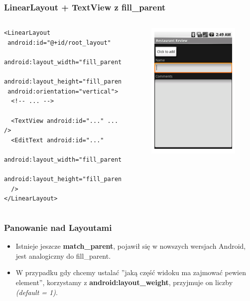 \documentclass{beamer}
\begin{document}
\begin{frame}[fragile]\frametitle{LinearLayout + TextView z fill\_parent}
 \begin{columns}
  \begin{verbatim}
<LinearLayout
 android:id="@+id/root_layout"
 android:layout_width="fill_parent"
 android:layout_height="fill_parent"
 android:orientation="vertical">
  <!-- ... -->

  <TextView android:id="..." ... />
  <EditText android:id="..."
   android:layout_width="fill_parent"
   android:layout_height="fill_parent" 
  />
</LinearLayout>

  \end{verbatim}
  \begin{figure}
   \includegraphics[width=.7\textwidth]{images/linearlayout_fill}   
  \end{figure}

 \end{columns}
\end{frame}

\begin{frame}[fragile]\frametitle{Panowanie nad Layoutami}
\begin{itemize}
 \item Istnieje jeszcze \textbf{match\_parent}, pojawił się w nowszych wersjach Android, jest analogiczny do fill\_parent.
 \item W przypadku gdy chcemy ustalać ''jaką część widoku ma zajmować pewien element'', korzystamy z \textbf{android:layout\_weight}, przyjmuje on liczby \textit{(default = 1)}.
\end{itemize}
\end{frame}
\end{document}
